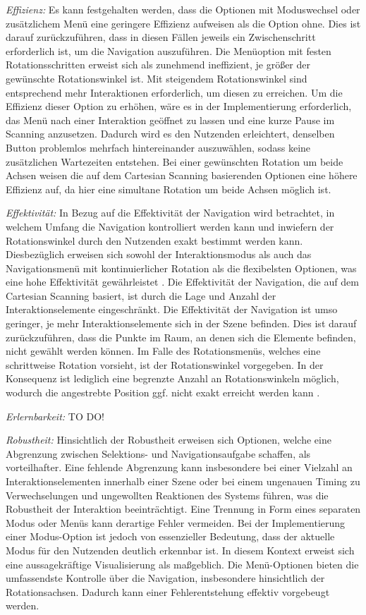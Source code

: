 \textit{Effizienz:}
Es kann festgehalten werden, dass die Optionen mit Moduswechsel oder zusätzlichem Menü eine geringere Effizienz aufweisen als die Option ohne. Dies ist darauf zurückzuführen, dass in diesen Fällen jeweils ein Zwischenschritt erforderlich ist, um die Navigation auszuführen. Die Menüoption mit festen Rotationsschritten erweist sich als zunehmend ineffizient, je größer der gewünschte Rotationswinkel ist. Mit steigendem Rotationswinkel sind entsprechend mehr Interaktionen erforderlich, um diesen zu erreichen. Um die Effizienz dieser Option zu erhöhen, wäre es in der Implementierung erforderlich, das Menü nach einer Interaktion geöffnet zu lassen und eine kurze Pause im Scanning anzusetzen. Dadurch wird es den Nutzenden erleichtert, denselben Button problemlos mehrfach hintereinander auszuwählen, sodass keine zusätzlichen Wartezeiten entstehen. Bei einer gewünschten Rotation um beide Achsen weisen die auf dem Cartesian Scanning basierenden Optionen eine höhere Effizienz auf, da hier eine simultane Rotation um beide Achsen möglich ist.

\textit{Effektivität:}
In Bezug auf die Effektivität der Navigation wird betrachtet, in welchem Umfang die Navigation kontrolliert werden kann und inwiefern der Rotationswinkel durch den Nutzenden exakt bestimmt werden kann. Diesbezüglich erweisen sich sowohl der Interaktionsmodus als auch das Navigationsmenü mit kontinuierlicher Rotation als die flexibelsten Optionen, was eine hohe Effektivität gewährleistet \citep{10.1145/2159365.2159386}. Die Effektivität der Navigation, die auf dem Cartesian Scanning basiert, ist durch die Lage und Anzahl der Interaktionselemente eingeschränkt. Die Effektivität der Navigation ist umso geringer, je mehr Interaktionselemente sich in der Szene befinden. Dies ist darauf zurückzuführen, dass die Punkte im Raum, an denen sich die Elemente befinden, nicht gewählt werden können. Im Falle des Rotationsmenüs, welches eine schrittweise Rotation vorsieht, ist der Rotationswinkel vorgegeben. In der Konsequenz ist lediglich eine begrenzte Anzahl an Rotationswinkeln möglich, wodurch die angestrebte Position ggf. nicht exakt erreicht werden kann \citep{10.1145/2159365.2159386}.

\textit{Erlernbarkeit:} TO DO! 

\textit{Robustheit:}
Hinsichtlich der Robustheit erweisen sich Optionen, welche eine Abgrenzung zwischen Selektions- und Navigationsaufgabe schaffen, als vorteilhafter. Eine fehlende Abgrenzung kann insbesondere bei einer Vielzahl an Interaktionselementen innerhalb einer Szene oder bei einem ungenauen Timing zu Verwechselungen und ungewollten Reaktionen des Systems führen, was die Robustheit der Interaktion beeinträchtigt. Eine Trennung in Form eines separaten Modus oder Menüs kann derartige Fehler vermeiden. Bei der Implementierung einer Modus-Option ist jedoch von essenzieller Bedeutung, dass der aktuelle Modus für den Nutzenden deutlich erkennbar ist. In diesem Kontext erweist sich eine aussagekräftige Visualisierung als maßgeblich. Die Menü-Optionen bieten die umfassendste Kontrolle über die Navigation, insbesondere hinsichtlich der Rotationsachsen. Dadurch kann einer Fehlerentstehung effektiv vorgebeugt werden. 

